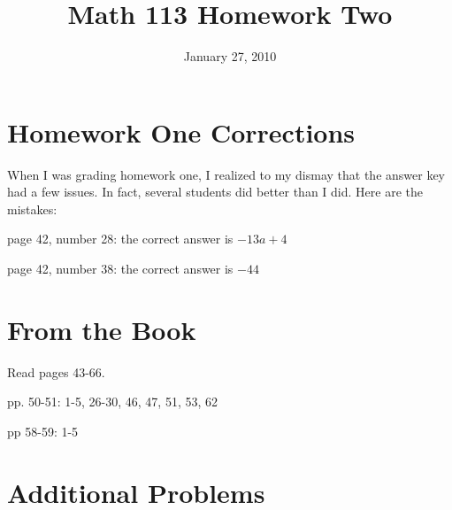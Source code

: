 \documentclass[fleqn,addpoints]{exam}
\title{Math 113 Homework Two}
\author{}
\date{January 27, 2010}
\begin{document}
\maketitle

\section{Homework One Corrections}

When I was grading homework one, I realized to my dismay that the answer key had a few issues.  In fact, several
students did better than I did.  Here are the mistakes:

page 42, number 28: the correct answer is \(-13a + 4\)

page 42, number 38: the correct answer is \(-44\)

\section{From the Book}

Read pages 43-66.

pp. 50-51: 1-5, 26-30, 46, 47, 51, 53, 62

pp 58-59: 1-5

\section{Additional Problems}
\end{document}

